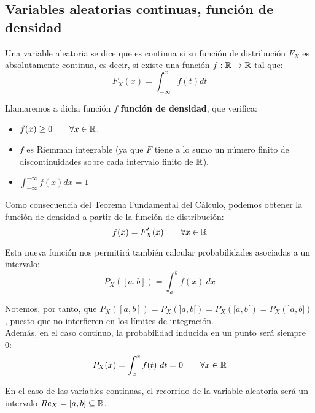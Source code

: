 \subsection{Variables aleatorias continuas, función de densidad}

\begin{definicion}
    Una variable aleatoria se dice que es continua si su función de distribución $F_X$ es absolutamente continua, es decir, si existe una función $f:\mathbb R \rightarrow \mathbb R$ tal que:
    $$F_X(x) = \int_{-\infty}^x f(t) dt$$
\end{definicion}

Llamaremos a dicha función $f$ \textbf{función de densidad}, que verifica:
\begin{itemize}
  \item $f(x) \geq 0 \qquad \forall x \in \mathbb R$.
  \item $f$ es Riemman integrable (ya que $F$ tiene a lo sumo un número finito de discontinuidades sobre cada intervalo finito de $\mathbb R$).
  \item $\displaystyle \int_{-\infty}^{+\infty}f(x) dx = 1$
\end{itemize}

Como consecuencia del Teorema Fundamental del Cálculo, podemos obtener la función de densidad a partir de la función de distribución:
$$f(x) = F_X'(x) \qquad \forall x \in \mathbb R$$

Esta nueva función nos permitirá también calcular probabilidades asociadas a un intervalo:
$$P_X([a,b]) = \int_a^b f(x)~dx$$

Notemos, por tanto, que $P_X([a,b]) = P_X(]a,b[) = P_X([a,b[) = P_X(]a,b])$, puesto que no interfieren en los límites de integración.\\

Además, en el caso continuo, la probabilidad inducida en un punto será siempre~$0$:
$$P_X(x) = \int_x^x f(t)~dt = 0 \qquad \forall x \in \mathbb R$$

En el caso de las variables continuas, el recorrido de la variable aleatoria será un intervalo $Re_X = [a,b] \subseteq \mathbb R$.


